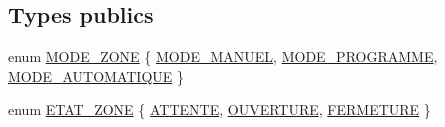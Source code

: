 \subsection*{Types publics}
\begin{DoxyCompactItemize}
\item 
enum \hyperlink{class_zone_a07d053965fa6722cfc3f80d225677497}{M\+O\+D\+E\+\_\+\+Z\+O\+NE} \{ \hyperlink{class_zone_a07d053965fa6722cfc3f80d225677497a3c754e4a55948ba52fb8329c2874e54d}{M\+O\+D\+E\+\_\+\+M\+A\+N\+U\+EL}, 
\hyperlink{class_zone_a07d053965fa6722cfc3f80d225677497a95a13ba1fd5830ac255f4cc762e0261a}{M\+O\+D\+E\+\_\+\+P\+R\+O\+G\+R\+A\+M\+ME}, 
\hyperlink{class_zone_a07d053965fa6722cfc3f80d225677497a337c2f25b250da75f6590ba4735a19df}{M\+O\+D\+E\+\_\+\+A\+U\+T\+O\+M\+A\+T\+I\+Q\+UE}
 \}
\item 
enum \hyperlink{class_zone_afed66edb8ab1446dcab5186028648880}{E\+T\+A\+T\+\_\+\+Z\+O\+NE} \{ \hyperlink{class_zone_afed66edb8ab1446dcab5186028648880ab0e5fa888d8db41efd00d61e527e80d3}{A\+T\+T\+E\+N\+TE}, 
\hyperlink{class_zone_afed66edb8ab1446dcab5186028648880ac2006f5be5833d01d79c46e0878e581d}{O\+U\+V\+E\+R\+T\+U\+RE}, 
\hyperlink{class_zone_afed66edb8ab1446dcab5186028648880ac566eede85c70a9ecd7555dfe1df9871}{F\+E\+R\+M\+E\+T\+U\+RE}
 \}
\end{DoxyCompactItemize}
